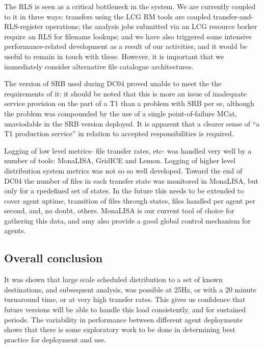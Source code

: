 \documentclass{cmspaper}
\begin{document}
The RLS is seen as a critical bottleneck in the system. We are currently coupled to it in
three ways: transfers using the LCG RM tools are coupled transfer-and-RLS-register
operations; the analysis jobs submitted via an LCG resource borker require an RLS for
filename lookups; and we have also triggered some intensive performance-related
development as a result of our activities, and it would be useful to remain in touch with
these. However, it is important that we immediately consider alternative file catalogue
architectures.

The version of SRB used during DC04 proved unable to meet the the requirements of it: it
should be noted that this is more an issue of inadequate service provision on the part
of a T1 than a problem with SRB per se, although the problem was compounded by the use of
a single point-of-failure MCat, unaviodable in the SRB version deployed. It is apparent
 that a clearer sense of ``a T1 production service'' in relation to accepted 
responsibilities is required.

Logging of low level metrics- file transfer rates, etc- was handled very well by a number
of tools: MonaLISA, GridICE and Lemon. Logging of higher level distribution system metrics
was not so so well developed. Toward the end of DC04 the number of files in each transfer 
state was monitored in MonaLISA, but only for a rpedefined set of states. In the future
this needs to be extended to cover agent uptime, transition of files through states, files
handled per agent per second, and, no doubt, others. MonaLISA is our current tool of 
choice for gathering this data, and amy also provide a good global control mechanism for
agents.

\subsection{Overall conclusion}
It was shown that large scale scheduled distribution to a set of known destinations, and
subsequent analysis, was possible at 25Hz, or with a 20 minute turnaround time, or at
very high transfer rates. This gives us confidence that future versions will be able to 
handle this load consistently, and for sustained periods. The variability in performance
between different agent deployments shows that there is some exploratory work to be done
in determining best practice for deployment and use.



\end{document}
